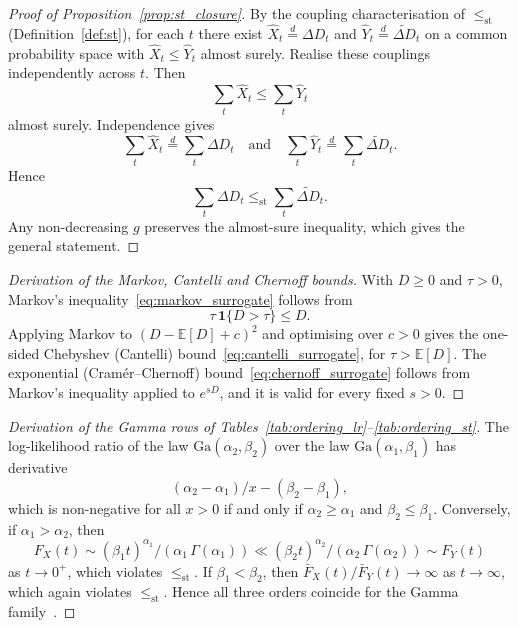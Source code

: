 \documentclass[11pt,a4paper]{article}
\theoremstyle{plain}
\theoremstyle{definition}
\theoremstyle{remark}
\begin{document}
\label{prf:prop:st_closure}
\begin{proof}[Proof of Proposition~\ref{prop:st_closure}]
By the coupling characterisation of $\le_{\mathrm{st}}$ (Definition~\ref{def:st}), for each $t$ there exist $\hat X_t \stackrel{d}{=} \Delta D_t$ and $\hat Y_t \stackrel{d}{=} \widetilde{\Delta D}_t$ on a common probability space with $\hat X_t \le \hat Y_t$ almost surely.
Realise these couplings independently across $t$.
Then
\begin{equation}
  \sum_t \hat X_t \le \sum_t \hat Y_t
\end{equation}
almost surely.
Independence gives
\begin{equation}
  \sum_t \hat X_t \stackrel{d}{=} \sum_t \Delta D_t
  \quad\text{and}\quad
  \sum_t \hat Y_t \stackrel{d}{=} \sum_t \widetilde{\Delta D}_t.
\end{equation}
Hence
\begin{equation}
  \sum_t \Delta D_t \le_{\mathrm{st}} \sum_t \widetilde{\Delta D}_t.
\end{equation}
Any non-decreasing $g$ preserves the almost-sure inequality, which gives the general statement.
\end{proof}

\label{drv:routeI_bounds}
\begin{proof}[Derivation of the Markov, Cantelli and Chernoff bounds]
With $D \ge 0$ and $\tau > 0$, Markov's inequality~\eqref{eq:markov_surrogate} follows from
\begin{equation}
  \tau\,\mathbf{1}\{D > \tau\} \le D.
\end{equation}
Applying Markov to $(D - \mathbb{E}[D] + c)^2$ and optimising over $c > 0$ gives the one-sided Chebyshev (Cantelli) bound~\eqref{eq:cantelli_surrogate}, for $\tau > \mathbb{E}[D]$.
The exponential (Cram\'er--Chernoff) bound~\eqref{eq:chernoff_surrogate} follows from Markov's inequality applied to $e^{sD}$, and it is valid for every fixed $s > 0$.
\end{proof}

\label{drv:order_gamma}
\begin{proof}[Derivation of the Gamma rows of Tables~\ref{tab:ordering_lr}--\ref{tab:ordering_st}]
The log-likelihood ratio of the law $\mathrm{Ga}(\alpha_2,\beta_2)$ over the law $\mathrm{Ga}(\alpha_1,\beta_1)$ has derivative
\begin{equation}
  (\alpha_2 - \alpha_1)/x - (\beta_2 - \beta_1),
\end{equation}
which is non-negative for all $x > 0$ if and only if $\alpha_2 \ge \alpha_1$ and $\beta_2 \le \beta_1$.
Conversely, if $\alpha_1 > \alpha_2$, then
\begin{equation}
  F_X(t) \sim (\beta_1 t)^{\alpha_1}/(\alpha_1\,\Gamma(\alpha_1)) \ll (\beta_2 t)^{\alpha_2}/(\alpha_2\,\Gamma(\alpha_2)) \sim F_Y(t)
\end{equation}
as $t \to 0^+$, which violates $\le_{\mathrm{st}}$.
If $\beta_1 < \beta_2$, then $\bar F_X(t)/\bar F_Y(t) \to \infty$ as $t \to \infty$, which again violates $\le_{\mathrm{st}}$.
Hence all three orders coincide for the Gamma family~\cite[Sec.~1.C]{ShakedShanthikumar2007}.
\end{proof}
\end{document}
